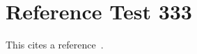 \documentclass{article}
\begin{document}
\section{Reference Test 333}
This cites a reference~\cite{test333}.

\end{document}
